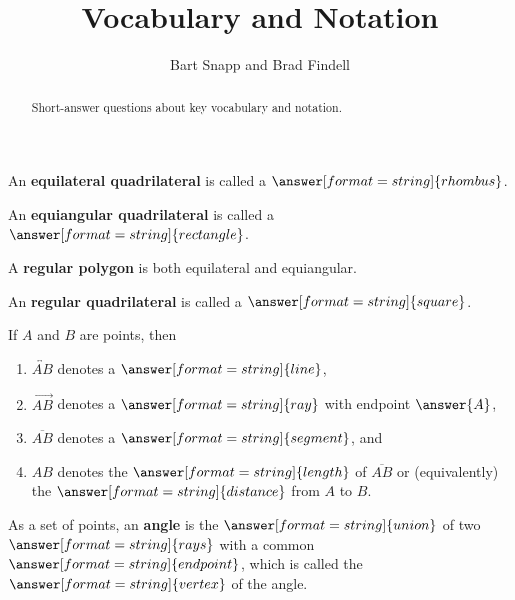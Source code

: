 \documentclass[nooutcomes]{ximera}
\title{Vocabulary and Notation}
\author{Bart Snapp and Brad Findell}
\begin{document}
\begin{abstract}
Short-answer questions about key vocabulary and notation. 
\end{abstract}
\maketitle


\begin{question}  
An \textbf{equilateral quadrilateral} is called a $\answer[format=string]{rhombus}$.
\end{question}

\begin{question}  
An \textbf{equiangular quadrilateral} is called a $\answer[format=string]{rectangle}$. 
\end{question}

A \textbf{regular polygon} is both equilateral and equiangular. 

\begin{question}  
An \textbf{regular quadrilateral} is called a $\answer[format=string]{square}$. 
\end{question}


\begin{question}
If $A$ and $B$ are points, then 
\begin{enumerate}
\item $\overleftrightarrow{AB}$ denotes a $\answer[format=string]{line}$, 
\item $\overrightarrow{AB}$ denotes a $\answer[format=string]{ray}$ with endpoint $\answer{A}$,  
\item $\overline{AB}$ denotes a $\answer[format=string]{segment}$, and 
\item $AB$ denotes the $\answer[format=string]{length}$ of $\overline{AB}$ or (equivalently) the $\answer[format=string]{distance}$ from $A$ to $B$.  
\end{enumerate}
\end{question}


\begin{question}
As a set of points, an \textbf{angle} is the $\answer[format=string]{union}$ of two $\answer[format=string]{rays}$ with a common $\answer[format=string]{endpoint}$, which is called the $\answer[format=string]{vertex}$ of the angle.  \end{question}
\end{document}
